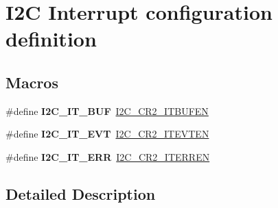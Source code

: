 \hypertarget{group___i2_c___interrupt__configuration__definition}{}\section{I2C Interrupt configuration definition}
\label{group___i2_c___interrupt__configuration__definition}
\subsection*{Macros}
\begin{DoxyCompactItemize}
\item 
\#define {\bfseries I2\+C\+\_\+\+I\+T\+\_\+\+B\+UF}~\hyperlink{group___peripheral___registers___bits___definition_ga2efbe5d96ed0ce447a45a62e8317a68a}{I2\+C\+\_\+\+C\+R2\+\_\+\+I\+T\+B\+U\+F\+EN}\hypertarget{group___i2_c___interrupt__configuration__definition_gad3ff3f405b882aa4d2f91310aa1cc0df}{}\label{group___i2_c___interrupt__configuration__definition_gad3ff3f405b882aa4d2f91310aa1cc0df}

\item 
\#define {\bfseries I2\+C\+\_\+\+I\+T\+\_\+\+E\+VT}~\hyperlink{group___peripheral___registers___bits___definition_ga3b1ebaf8173090ec469b055b98e585d2}{I2\+C\+\_\+\+C\+R2\+\_\+\+I\+T\+E\+V\+T\+EN}\hypertarget{group___i2_c___interrupt__configuration__definition_gadd59efa313e1598a084a1e5ec3905b02}{}\label{group___i2_c___interrupt__configuration__definition_gadd59efa313e1598a084a1e5ec3905b02}

\item 
\#define {\bfseries I2\+C\+\_\+\+I\+T\+\_\+\+E\+RR}~\hyperlink{group___peripheral___registers___bits___definition_ga6f14ae48e4609c2b3645211234cba974}{I2\+C\+\_\+\+C\+R2\+\_\+\+I\+T\+E\+R\+R\+EN}\hypertarget{group___i2_c___interrupt__configuration__definition_gadba3667b439cbf4ba1e6e9aec961ab03}{}\label{group___i2_c___interrupt__configuration__definition_gadba3667b439cbf4ba1e6e9aec961ab03}

\end{DoxyCompactItemize}


\subsection{Detailed Description}

